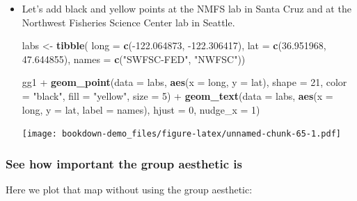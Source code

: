 \documentclass[]{book}
\newenvironment{Shaded}{\begin{snugshade}}{\end{snugshade}}
\newcommand{\KeywordTok}[1]{\textcolor[rgb]{0.13,0.29,0.53}{\textbf{{#1}}}}
\newcommand{\DataTypeTok}[1]{\textcolor[rgb]{0.13,0.29,0.53}{{#1}}}
\newcommand{\DecValTok}[1]{\textcolor[rgb]{0.00,0.00,0.81}{{#1}}}
\newcommand{\FloatTok}[1]{\textcolor[rgb]{0.00,0.00,0.81}{{#1}}}
\newcommand{\StringTok}[1]{\textcolor[rgb]{0.31,0.60,0.02}{{#1}}}
\newcommand{\NormalTok}[1]{{#1}}
\theoremstyle{definition}
\theoremstyle{definition}
\theoremstyle{remark}
\begin{document}
\begin{itemize}
\item
  Let's add black and yellow points at the NMFS lab in Santa Cruz and at
  the Northwest Fisheries Science Center lab in Seattle.

\begin{Shaded}
\begin{Highlighting}[]
\NormalTok{labs <-}\StringTok{ }\KeywordTok{tibble}\NormalTok{(}
  \DataTypeTok{long =} \KeywordTok{c}\NormalTok{(-}\FloatTok{122.064873}\NormalTok{, -}\FloatTok{122.306417}\NormalTok{),}
  \DataTypeTok{lat =} \KeywordTok{c}\NormalTok{(}\FloatTok{36.951968}\NormalTok{, }\FloatTok{47.644855}\NormalTok{),}
  \DataTypeTok{names =} \KeywordTok{c}\NormalTok{(}\StringTok{"SWFSC-FED"}\NormalTok{, }\StringTok{"NWFSC"}\NormalTok{))  }

\NormalTok{gg1 +}\StringTok{ }
\StringTok{  }\KeywordTok{geom_point}\NormalTok{(}\DataTypeTok{data =} \NormalTok{labs, }\KeywordTok{aes}\NormalTok{(}\DataTypeTok{x =} \NormalTok{long, }\DataTypeTok{y =} \NormalTok{lat), }\DataTypeTok{shape =} \DecValTok{21}\NormalTok{, }\DataTypeTok{color =} \StringTok{"black"}\NormalTok{, }\DataTypeTok{fill =} \StringTok{"yellow"}\NormalTok{, }\DataTypeTok{size =} \DecValTok{5}\NormalTok{) +}
\StringTok{  }\KeywordTok{geom_text}\NormalTok{(}\DataTypeTok{data =} \NormalTok{labs, }\KeywordTok{aes}\NormalTok{(}\DataTypeTok{x =} \NormalTok{long, }\DataTypeTok{y =} \NormalTok{lat, }\DataTypeTok{label =} \NormalTok{names), }\DataTypeTok{hjust =} \DecValTok{0}\NormalTok{, }\DataTypeTok{nudge_x =} \DecValTok{1}\NormalTok{)}
\end{Highlighting}
\end{Shaded}

  \texttt{[image: bookdown-demo\_files/figure-latex/unnamed-chunk-65-1.pdf]}
\end{itemize}

\subsubsection{See how important the group aesthetic
is}\label{see-how-important-the-group-aesthetic-is}

Here we plot that map without using the group aesthetic:
\end{document}
